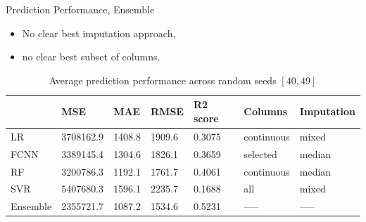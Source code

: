 \documentclass[xcolor=table]{beamer} %
\begin{document}
\begin{frame}{Prediction Performance, Ensemble}
\vspace{-1cm}
\begin{itemize}
    \item No clear best imputation approach,
    \item no clear best subset of columns.
\end{itemize}
\begin{table}[ht!]
\scriptsize
    \hspace{-0.7cm}
    \begin{tabular}{l|l|l|l|l|l|l}
                 & MSE        & MAE     & RMSE    & R2 score & Columns & Imputation\\
        \hline
        LR       & 3708162.9 & 1408.8 & 1909.6 & 0.3075 & continuous & mixed \\
        FCNN     & 3389145.4 & 1304.6 & 1826.1 & 0.3659 & selected & median \\
        RF       & 3200786.3 & 1192.1 & 1761.7 & 0.4061 & continuous & median \\
        SVR      & 5407680.3 & 1596.1 & 2235.7  & 0.1688 & all & mixed \\
        Ensemble & 2355721.7 & 1087.2 & 1534.6  & 0.5231 & ----- & ----- \\
    \end{tabular}
    \caption{Average prediction performance across random seeds $[40, 49]$}
    \label{tab:pred_perf}
\end{table}
\end{frame}
\end{document}
